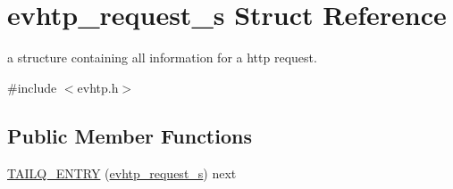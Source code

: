 \hypertarget{structevhtp__request__s}{\section{evhtp\-\_\-request\-\_\-s \-Struct \-Reference}
\label{structevhtp__request__s}
}


a structure containing all information for a http request.  




{\ttfamily \#include $<$evhtp.\-h$>$}

\subsection*{\-Public \-Member \-Functions}
\begin{DoxyCompactItemize}
\item 
\hyperlink{structevhtp__request__s_aafae5652c2c5f39a21185a64eaf7c3b6}{\-T\-A\-I\-L\-Q\-\_\-\-E\-N\-T\-R\-Y} (\hyperlink{structevhtp__request__s}{evhtp\-\_\-request\-\_\-s}) next
\end{DoxyCompactItemize}
